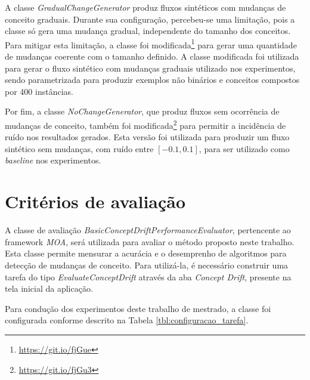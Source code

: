 \documentclass[qual, classic, a4paper]{ufbathesis}
\begin{document}
A classe \textit{GradualChangeGenerator} produz fluxos sintéticos com mudanças de conceito graduais.
Durante sua configuração, percebeu-se uma limitação, pois a classe só gera uma mudança gradual, independente do tamanho dos conceitos.
Para mitigar esta limitação, a classe foi modificada\footnote{\url{https://git.io/fjGue}} para gerar uma quantidade de mudanças coerente com o tamanho definido.
A classe modificada foi utilizada para gerar o fluxo sintético com mudanças graduais utilizado nos experimentos, 
sendo parametrizada para produzir exemplos não binários e conceitos compostos por 400 instâncias.



Por fim, a classe \textit{NoChangeGenerator}, que produz fluxos sem ocorrência de mudanças de conceito, também foi modificada\footnote{\url{https://git.io/fjGu3}} para permitir a incidência de ruído nos resultados gerados.
Esta versão foi utilizada para produzir um fluxo sintético sem mudanças, com ruído entre $[-0.1, 0.1]$, para ser utilizado como \textit{baseline} nos experimentos.

\section{Critérios de avaliação}

A classe de avaliação \textit{BasicConceptDriftPerformanceEvaluator}, pertencente ao framework \textit{MOA}, será utilizada para avaliar o método proposto neste trabalho.
Esta classe permite mensurar a acurácia e o desemprenho de algoritmos para detecção de mudanças de conceito.
Para utilizá-la, é necessário construir uma tarefa do tipo \textit{EvaluateConceptDrift} através da aba \textit{Concept Drift}, presente na tela inicial da aplicação.

Para condução dos experimentos deste trabalho de mestrado, a classe foi configurada conforme descrito na Tabela \ref{tbl:configuracao_tarefa}.
\end{document}
